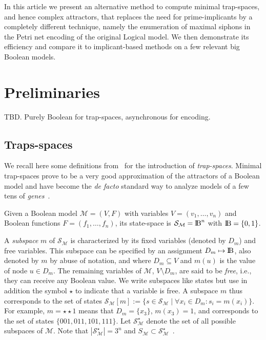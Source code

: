 \documentclass[runningheads]{llncs}
\newcommand{\bbbb}{{\rm I\!B}}
\begin{document}
In this article we present an alternative method to compute minimal trap-spaces, and hence complex attractors, that replaces the need for prime-implicants by a completely different technique, namely the enumeration of maximal siphons in the Petri net encoding of the original Logical model.
We then demonstrate its efficiency and compare it to implicant-based methods on a few relevant big Boolean models.

\section{Preliminaries}

TBD.
Purely Boolean for trap-spaces, asynchronous for encoding.

\subsection{Traps-spaces}

We recall here some definitions from~\cite{klarner2015computing} for the introduction of \emph{trap-spaces}.
Minimal trap-spaces prove to be a very good approximation of the attractors of a Boolean model and have become the \emph{de facto} standard way to analyze models of a few tens of \emph{genes}~\cite{klarner2017pyboolnet,cifuentes2020control}.

Given a Boolean model \(\mathcal{M} = (V, F)\) with variables \(V=(v_{1},\dots,v_{n})\) and Boolean functions \(F=(f_{1},\dots,f_{n})\), its state-space is \(\mathcal{S}_{\mathcal{M}} =\bbbb^{n}\) with \(\bbbb = \{0, 1\}\).

A \emph{subspace} \(m\) of \(\mathcal{S}_{\mathcal{M}}\) is characterized by its fixed variables (denoted by \(D_m\)) and free variables.
This subspace can be specified by an assignment \(D_m \mapsto \bbbb\), also denoted by \(m\) by abuse of notation, and where \(D_m \subseteq V\) and \(m(u)\) is the value of node \(u \in D_m\).
The remaining variables of \(\mathcal{M}\), \(V \setminus D_m\), are said to be \emph{free}, i.e., they can receive any Boolean value.
We write subspaces like states but use in addition the symbol \(\star\) to indicate that a variable is free.
A subspace \(m\) thus corresponds to the set of states \(\mathcal{S}_{\mathcal{M}}[m] := \{s \in \mathcal{S}_{\mathcal{M}}\;|\;\forall x_i \in D_m : s_i = m(x_i)\}\).
For example, \(m = \star\star1\) means that \(D_m = \{x_3\}\), \(m(x_3) = 1\), and corresponds to the set of states \(\{001, 011, 101, 111\}\).
Let \(\mathcal{S}_{\mathcal{M}}^{\star}\) denote the set of all possible subspaces of \(\mathcal{M}\). Note that \(\left|\mathcal{S}_{\mathcal{M}}^{\star}\right| = 3^n\) and \(S_{\mathcal{M}} \subset \mathcal{S}_{\mathcal{M}}^{\star}\)~\cite{klarner2015computing}.
\end{document}
